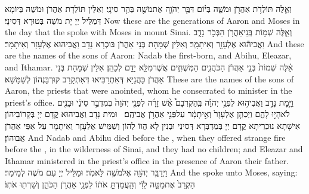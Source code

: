 \newperek
{}
{וְאֵ֛לֶּה תּוֹלְדֹ֥ת אַהֲרֹ֖ן וּמֹשֶׁ֑ה בְּי֗וֹם דִּבֶּ֧ר יְהֹוָ֛ה אֶת\maqqaf מֹשֶׁ֖ה בְּהַ֥ר סִינָֽי׃}
{וְאִלֵּין תּוֹלְדָת אַהֲרֹן וּמֹשֶׁה בְּיוֹמָא דְּמַלֵּיל יְיָ יָת מֹשֶׁה בְּטוּרָא דְּסִינָי׃}
{Now these are the generations of Aaron and Moses in the day that the \lord\space spoke with Moses in mount Sinai.}{}
{וְאֵ֛לֶּה שְׁמ֥וֹת בְּֽנֵי\maqqaf אַהֲרֹ֖ן הַבְּכֹ֣ר \pasek  נָדָ֑ב וַאֲבִיה֕וּא אֶלְעָזָ֖ר וְאִיתָמָֽר׃}
{וְאִלֵּין שְׁמָהָת בְּנֵי אַהֲרֹן בּוּכְרָא נָדָב וַאֲבִיהוּא אֶלְעָזָר וְאִיתָמָר׃}
{And these are the names of the sons of Aaron: Nadab the first-born, and Abihu, Eleazar, and Ithamar.}{}
{אֵ֗לֶּה שְׁמוֹת֙ בְּנֵ֣י אַהֲרֹ֔ן הַכֹּהֲנִ֖ים הַמְּשֻׁחִ֑ים אֲשֶׁר\maqqaf מִלֵּ֥א יָדָ֖ם לְכַהֵֽן׃}
{אִלֵּין שְׁמָהָת בְּנֵי אַהֲרֹן כָּהֲנַיָּא דְּאִתְרַבִּיאוּ דְּאִתְקָרַב קוּרְבָּנְהוֹן לְשַׁמָּשָׁא׃}
{These are the names of the sons of Aaron, the priests that were anointed, whom he consecrated to minister in the priest’s office.}{}
{וַיָּ֣מׇת נָדָ֣ב וַאֲבִיה֣וּא לִפְנֵ֣י יְהֹוָ֡ה בְּֽהַקְרִבָם֩ אֵ֨שׁ זָרָ֜ה לִפְנֵ֤י יְהֹוָה֙ בְּמִדְבַּ֣ר סִינַ֔י וּבָנִ֖ים לֹא\maqqaf הָי֣וּ לָהֶ֑ם וַיְכַהֵ֤ן אֶלְעָזָר֙ וְאִ֣יתָמָ֔ר עַל\maqqaf פְּנֵ֖י אַהֲרֹ֥ן אֲבִיהֶֽם׃ \petucha }
{וּמִית נָדָב וַאֲבִיהוּא קֳדָם יְיָ בְּקָרוֹבֵיהוֹן אִישָׁתָא נוּכְרֵיתָא קֳדָם יְיָ בְּמַדְבְּרָא דְּסִינַי וּבְנִין לָא הֲווֹ לְהוֹן וְשַׁמֵּישׁ אֶלְעָזָר וְאִיתָמָר עַל אַפֵּי אַהֲרֹן אֲבוּהוֹן׃}
{And Nadab and Abihu died before the \lord, when they offered strange fire before the \lord, in the wilderness of Sinai, and they had no children; and Eleazar and Ithamar ministered in the priest’s office in the presence of Aaron their father.}{}
{וַיְדַבֵּ֥ר יְהֹוָ֖ה אֶל\maqqaf מֹשֶׁ֥ה לֵּאמֹֽר׃}
{וּמַלֵּיל יְיָ עִם מֹשֶׁה לְמֵימַר׃}
{And the \lord\space spoke unto Moses, saying:}{}
{הַקְרֵב֙ אֶת\maqqaf מַטֵּ֣ה לֵוִ֔י וְהַֽעֲמַדְתָּ֣ אֹת֔וֹ לִפְנֵ֖י אַהֲרֹ֣ן הַכֹּהֵ֑ן וְשֵׁרְת֖וּ אֹתֽוֹ׃}
